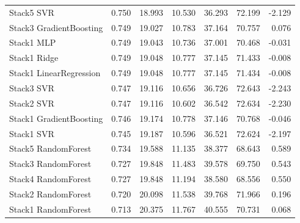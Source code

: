 \begin{longtable}{lrrrrrr}
    Stack5 SVR & 0.750 & 18.993 & 10.530 & 36.293 & 72.199 & -2.129 \\
    Stack3 GradientBoosting & 0.749 & 19.027 & 10.783 & 37.164 & 70.757 & 0.076 \\
    Stack1 MLP & 0.749 & 19.043 & 10.736 & 37.001 & 70.468 & -0.031 \\
    Stack1 Ridge & 0.749 & 19.048 & 10.777 & 37.145 & 71.433 & -0.008 \\
    Stack1 LinearRegression & 0.749 & 19.048 & 10.777 & 37.145 & 71.434 & -0.008 \\
    Stack3 SVR & 0.747 & 19.116 & 10.656 & 36.726 & 72.643 & -2.243 \\
    Stack2 SVR & 0.747 & 19.116 & 10.602 & 36.542 & 72.634 & -2.230 \\
    Stack1 GradientBoosting & 0.746 & 19.174 & 10.778 & 37.146 & 70.768 & -0.046 \\
    Stack1 SVR & 0.745 & 19.187 & 10.596 & 36.521 & 72.624 & -2.197 \\
    Stack5 RandomForest & 0.734 & 19.588 & 11.135 & 38.377 & 68.643 & 0.589 \\
    Stack3 RandomForest & 0.727 & 19.848 & 11.483 & 39.578 & 69.750 & 0.543 \\
    Stack4 RandomForest & 0.727 & 19.848 & 11.194 & 38.580 & 68.556 & 0.550 \\
    Stack2 RandomForest & 0.720 & 20.098 & 11.538 & 39.768 & 71.966 & 0.196 \\
    Stack1 RandomForest & 0.713 & 20.375 & 11.767 & 40.555 & 70.731 & 0.068 \\
\end{longtable}

